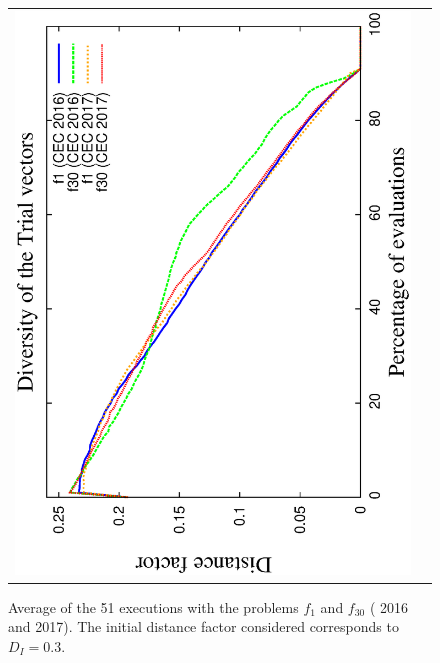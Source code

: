 \begin{figure}[t]
\begin{tabular}{cc}
   \includegraphics[scale=0.23, angle=-90]{img/Diversity_Trial.eps} 
\end{tabular}
\caption{ Average \DCN{} of the 51 executions with the problems $f_1$ and $f_{30}$ (\CEC{} 2016 and \CEC{} 2017). The initial distance factor considered corresponds to $D_I=0.3$.}
\label{fig:diversity}
\end{figure}



%
%

